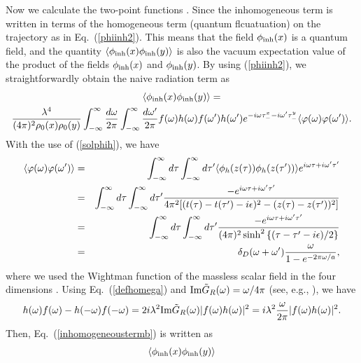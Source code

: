 \documentclass[aps,prd,preprintnumbers,nofootinbib,showpacs,11pt]{revtex4}%
\begin{document}
\begin{widetext}
Now we calculate the two-point functions \cite{IYZ,IYZ2013,IOTYZ}.
Since the inhomogeneous term is written in terms of the homogeneous term
 (quantum flcuatuation) on the trajectory as in Eq.~(\ref{phiinh2}). 
This means that the field $\phi_{\rm inh}(x)$ is a quantum field, and the quantity 
$\langle\phi_{\rm inh}(x)\phi_{\rm inh}(y)\rangle$ is also the vacuum expectation 
value of the product of the fields $\phi_{\rm inh}(x)$ and $\phi_{\rm inh}(y)$.
By using (\ref{phiinh2}), we straightforwardly obtain the naive radiation term as
\begin{multline}
\langle\phi_{\rm inh}(x)\phi_{\rm inh}(y)\rangle
  = \\
  {\lambda^4\over (4\pi)^2\rho_0(x)\rho_0(y)}
  \int _{-\infty}^{\infty}{d\omega\over2\pi}  \int _{-\infty}^{\infty}{d\omega'\over2\pi}
f(\omega)h(\omega)f(\omega')h(\omega')e^{-i\omega\tau_-^x-i\omega'\tau_-^y} \langle
\varphi(\omega)\varphi(\omega')\rangle.
\label{inhomogeneoustermb}
\end{multline}
With the use of (\ref{solphih}), we have
\begin{eqnarray}
\langle\varphi(\omega)\varphi(\omega')\rangle
&=&\int _{-\infty}^{\infty} d\tau \int _{-\infty}^{\infty} d\tau'\langle \phi_h(z(\tau))\phi_h(z(\tau'))\rangle
e^{i\omega\tau+i\omega'\tau'}
\nonumber\\
&=&\int _{-\infty}^{\infty} d\tau \int _{-\infty}^{\infty} d\tau'{-e^{i\omega\tau+i\omega'\tau'}\over 4\pi^2
[(t(\tau)-t(\tau')-i\epsilon)^2-(z(\tau)-z(\tau'))^2]}
\nonumber\\
&=&\int _{-\infty}^{\infty} d\tau \int _{-\infty}^{\infty} d\tau'{-e^{i\omega\tau+i\omega'\tau'}\over (4\pi)^2
\sinh^2\left\{(\tau-\tau'-i\epsilon)/2\right\}}
\nonumber\\
&=&\delta_D(\omega+\omega'){\omega\over 1-e^{-2\pi\omega/a}}, 
\end{eqnarray}
where we used the Wightman function of the massless scalar field in the four dimensions
\cite{BD}. Using Eq.~(\ref{defhomega}) and ${\rm Im}\tilde G_R(\omega)=\omega/4\pi$ (see, e.g., 
\cite{IYZ2013}), we have
\begin{eqnarray}
h(\omega)f(\omega)-h(-\omega)f(-\omega)
=2i\lambda^2 {\rm Im}\tilde G_R(\omega)|f(\omega)h(\omega)|^2 
=i\lambda^2{\omega\over 2\pi}|f(\omega)h(\omega)|^2.
\end{eqnarray}
Then, Eq.~(\ref{inhomogeneoustermb}) is written as
\begin{multline}
\langle\phi_{\rm inh}(x)\phi_{\rm inh}(y)\rangle \\

\end{multline}
\end{widetext}
\end{document}
